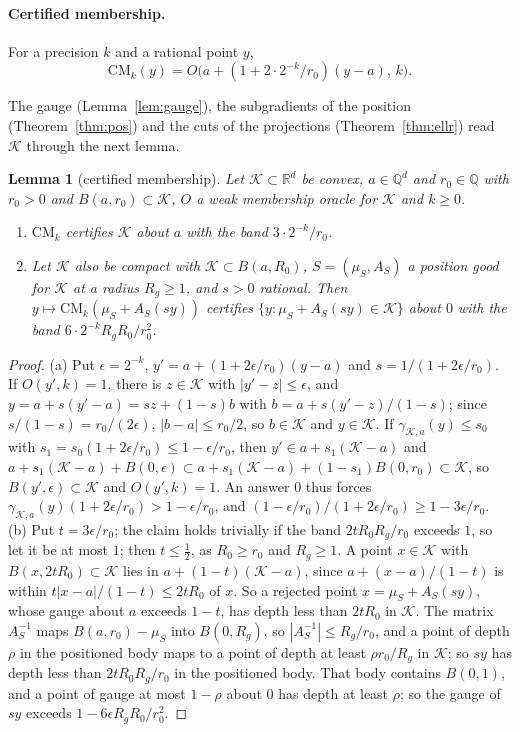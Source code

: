 \documentclass[11pt]{amsart}
\newtheorem{lemma}[theorem]{Lemma}
\theoremstyle{definition}
\numberwithin{equation}{section}
\newcommand{\R}{\mathbb{R}}
\newcommand{\cK}{\mathcal{K}}
\begin{document}
\paragraph{Certified membership.} For a precision $k$ and a rational point $y$,
\[
\mathrm{CM}_k(y)=O\bigl(a+(1+2\cdot2^{-k}/r_0)(y-a),\,k\bigr).
\]

The gauge (Lemma~\ref{lem:gauge}), the subgradients of the position (Theorem~\ref{thm:pos}) and the cuts of the projections (Theorem~\ref{thm:ellr}) read $\cK$ through the next lemma.

\begin{lemma}[certified membership]\label{lem:cm}
Let $\cK\subset\R^d$ be convex, $a\in\mathbb Q^d$ and $r_0\in\mathbb Q$ with $r_0>0$ and $B(a,r_0)\subset\cK$, $O$ a weak membership oracle for $\cK$ and $k\ge0$.
\begin{enumerate}[label=(\alph*)]
\item $\mathrm{CM}_k$ certifies $\cK$ about $a$ with the band $3\cdot2^{-k}/r_0$.
\item Let $\cK$ also be compact with $\cK\subset B(a,R_0)$, $S=(\mu_S,A_S)$ a position good for $\cK$ at a radius $R_g\ge1$, and $s>0$ rational. Then $y\mapsto\mathrm{CM}_k(\mu_S+A_S(sy))$ certifies $\{y:\mu_S+A_S(sy)\in\cK\}$ about $0$ with the band $6\cdot2^{-k}R_gR_0/r_0^2$.
\end{enumerate}
\end{lemma}

\begin{proof}
(a) Put $\epsilon=2^{-k}$, $y'=a+(1+2\epsilon/r_0)(y-a)$ and $s=1/(1+2\epsilon/r_0)$. If $O(y',k)=1$, there is $z\in\cK$ with $|y'-z|\le\epsilon$, and $y=a+s(y'-a)=sz+(1-s)b$ with $b=a+s(y'-z)/(1-s)$; since $s/(1-s)=r_0/(2\epsilon)$, $|b-a|\le r_0/2$, so $b\in\cK$ and $y\in\cK$. If $\gamma_{\cK,a}(y)\le s_0$ with $s_1=s_0(1+2\epsilon/r_0)\le1-\epsilon/r_0$, then $y'\in a+s_1(\cK-a)$ and $a+s_1(\cK-a)+B(0,\epsilon)\subset a+s_1(\cK-a)+(1-s_1)B(0,r_0)\subset\cK$, so $B(y',\epsilon)\subset\cK$ and $O(y',k)=1$. An answer $0$ thus forces $\gamma_{\cK,a}(y)(1+2\epsilon/r_0)>1-\epsilon/r_0$, and $(1-\epsilon/r_0)/(1+2\epsilon/r_0)\ge1-3\epsilon/r_0$.
(b) Put $t=3\epsilon/r_0$; the claim holds trivially if the band $2tR_0R_g/r_0$ exceeds $1$, so let it be at most $1$; then $t\le\frac12$, as $R_0\ge r_0$ and $R_g\ge1$. A point $x\in\cK$ with $B(x,2tR_0)\subset\cK$ lies in $a+(1-t)(\cK-a)$, since $a+(x-a)/(1-t)$ is within $t|x-a|/(1-t)\le2tR_0$ of $x$. So a rejected point $x=\mu_S+A_S(sy)$, whose gauge about $a$ exceeds $1-t$, has depth less than $2tR_0$ in $\cK$. The matrix $A_S^{-1}$ maps $B(a,r_0)-\mu_S$ into $B(0,R_g)$, so $|A_S^{-1}|\le R_g/r_0$, and a point of depth $\rho$ in the positioned body maps to a point of depth at least $\rho r_0/R_g$ in $\cK$; so $sy$ has depth less than $2tR_0R_g/r_0$ in the positioned body. That body contains $B(0,1)$, and a point of gauge at most $1-\rho$ about $0$ has depth at least $\rho$; so the gauge of $sy$ exceeds $1-6\epsilon R_gR_0/r_0^2$.
\end{proof}
\end{document}
